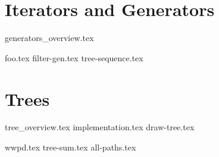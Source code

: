 \documentclass{exam}
\begin{document}
\section{Iterators and Generators}
{generators_overview.tex}
\begin{questions}
	{foo.tex}
	{filter-gen.tex}
	{tree-sequence.tex}
\end{questions}
\newpage
\section{Trees}
{tree_overview.tex}
{implementation.tex}
{draw-tree.tex}
\begin{questions}
{wwpd.tex}
{tree-sum.tex}
{all-paths.tex}
\end{questions}
\end{document}
